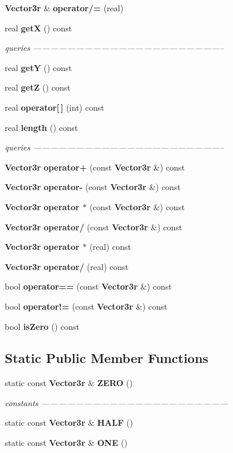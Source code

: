 \begin{CompactItemize}
{\bf Vector3r} \& {\bf operator/=} (real)
\item 
real {\bf get\-X} () const
\begin{CompactList}\small\item\em queries -------------------------------------------------------------------- \item\end{CompactList}\item 
real {\bf get\-Y} () const
\item 
real {\bf get\-Z} () const
\item 
real {\bf operator[$\,$]} (int) const
\item 
real {\bf length} () const
\begin{CompactList}\small\item\em queries -------------------------------------------------------------------- \item\end{CompactList}\item 
{\bf Vector3r} {\bf operator+} (const {\bf Vector3r} \&) const
\item 
{\bf Vector3r} {\bf operator-} (const {\bf Vector3r} \&) const
\item 
{\bf Vector3r} {\bf operator $\ast$} (const {\bf Vector3r} \&) const
\item 
{\bf Vector3r} {\bf operator/} (const {\bf Vector3r} \&) const
\item 
{\bf Vector3r} {\bf operator $\ast$} (real) const
\item 
{\bf Vector3r} {\bf operator/} (real) const
\item 
bool {\bf operator==} (const {\bf Vector3r} \&) const
\item 
bool {\bf operator!=} (const {\bf Vector3r} \&) const
\item 
bool {\bf is\-Zero} () const
\end{CompactItemize}
\subsection*{Static Public Member Functions}
\begin{CompactItemize}
\item 
static const {\bf Vector3r} \& {\bf ZERO} ()
\begin{CompactList}\small\item\em constants ------------------------------------------------------------------ \item\end{CompactList}\item 
static const {\bf Vector3r} \& {\bf HALF} ()
\item 
static const {\bf Vector3r} \& {\bf ONE} ()
\end{CompactItemize}
